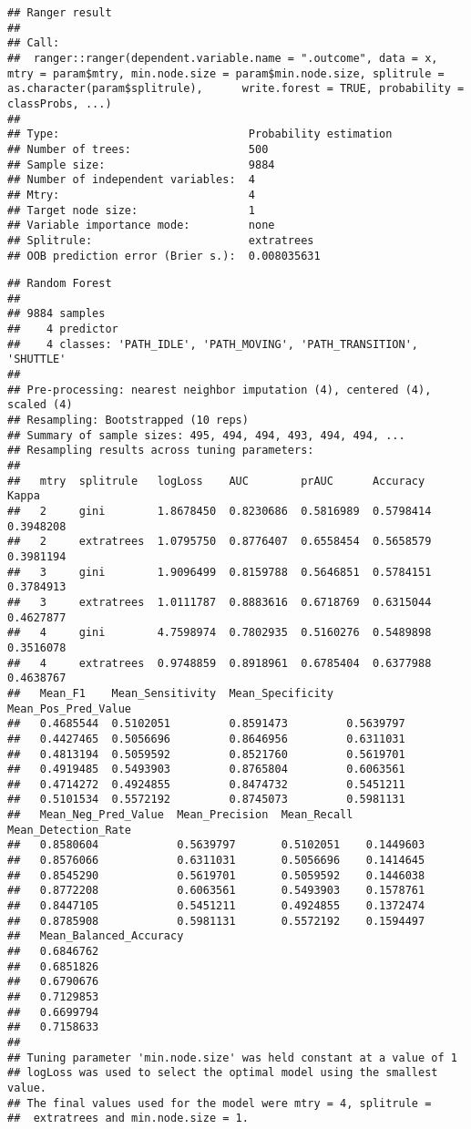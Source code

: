 \documentclass[]{article}
\begin{document}
\begin{verbatim}
## Ranger result
## 
## Call:
##  ranger::ranger(dependent.variable.name = ".outcome", data = x,      mtry = param$mtry, min.node.size = param$min.node.size, splitrule = as.character(param$splitrule),      write.forest = TRUE, probability = classProbs, ...) 
## 
## Type:                             Probability estimation 
## Number of trees:                  500 
## Sample size:                      9884 
## Number of independent variables:  4 
## Mtry:                             4 
## Target node size:                 1 
## Variable importance mode:         none 
## Splitrule:                        extratrees 
## OOB prediction error (Brier s.):  0.008035631
\end{verbatim}

\begin{verbatim}
## Random Forest 
## 
## 9884 samples
##    4 predictor
##    4 classes: 'PATH_IDLE', 'PATH_MOVING', 'PATH_TRANSITION', 'SHUTTLE' 
## 
## Pre-processing: nearest neighbor imputation (4), centered (4), scaled (4) 
## Resampling: Bootstrapped (10 reps) 
## Summary of sample sizes: 495, 494, 494, 493, 494, 494, ... 
## Resampling results across tuning parameters:
## 
##   mtry  splitrule   logLoss    AUC        prAUC      Accuracy   Kappa    
##   2     gini        1.8678450  0.8230686  0.5816989  0.5798414  0.3948208
##   2     extratrees  1.0795750  0.8776407  0.6558454  0.5658579  0.3981194
##   3     gini        1.9096499  0.8159788  0.5646851  0.5784151  0.3784913
##   3     extratrees  1.0111787  0.8883616  0.6718769  0.6315044  0.4627877
##   4     gini        4.7598974  0.7802935  0.5160276  0.5489898  0.3516078
##   4     extratrees  0.9748859  0.8918961  0.6785404  0.6377988  0.4638767
##   Mean_F1    Mean_Sensitivity  Mean_Specificity  Mean_Pos_Pred_Value
##   0.4685544  0.5102051         0.8591473         0.5639797          
##   0.4427465  0.5056696         0.8646956         0.6311031          
##   0.4813194  0.5059592         0.8521760         0.5619701          
##   0.4919485  0.5493903         0.8765804         0.6063561          
##   0.4714272  0.4924855         0.8474732         0.5451211          
##   0.5101534  0.5572192         0.8745073         0.5981131          
##   Mean_Neg_Pred_Value  Mean_Precision  Mean_Recall  Mean_Detection_Rate
##   0.8580604            0.5639797       0.5102051    0.1449603          
##   0.8576066            0.6311031       0.5056696    0.1414645          
##   0.8545290            0.5619701       0.5059592    0.1446038          
##   0.8772208            0.6063561       0.5493903    0.1578761          
##   0.8447105            0.5451211       0.4924855    0.1372474          
##   0.8785908            0.5981131       0.5572192    0.1594497          
##   Mean_Balanced_Accuracy
##   0.6846762             
##   0.6851826             
##   0.6790676             
##   0.7129853             
##   0.6699794             
##   0.7158633             
## 
## Tuning parameter 'min.node.size' was held constant at a value of 1
## logLoss was used to select the optimal model using the smallest value.
## The final values used for the model were mtry = 4, splitrule =
##  extratrees and min.node.size = 1.
\end{verbatim}
\end{document}
